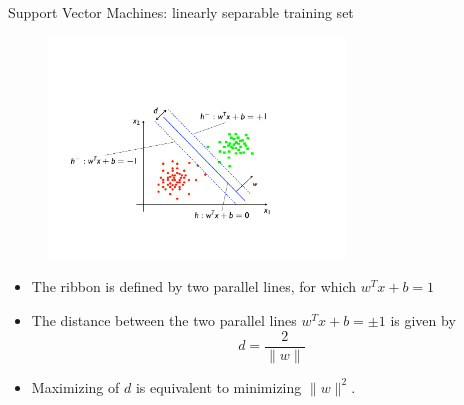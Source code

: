 \documentclass[xcolor=pdftex,dvipsnames,table]{beamer}
\begin{document}

\begin{frame}{Support Vector Machines: linearly separable training set}
	\begin{figure}[htb]
		\includegraphics[width=0.7\textwidth]{../graphics/SVM2.pdf}
	\end{figure}
	\begin{itemize}
		\item The ribbon is defined by two parallel lines, for which $w^Tx + b = 1$
		\item The distance between the two parallel lines $w^Tx + b = \pm 1$ is given by
		\begin{equation}
			d = \frac{2}{\|w\|}
		\end{equation}
		\item Maximizing of $d$ is equivalent to minimizing $\|w\|^2$.
	\end{itemize}
\end{frame}
\end{document}
